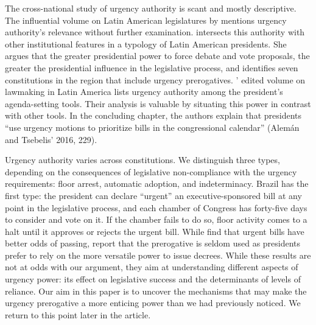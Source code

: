 \documentclass[letter,12pt]{article}
\begin{document}
The cross-national study of urgency authority is scant and mostly descriptive. The influential volume on Latin American legislatures by \citet{morgenstern.nacif.2002} mentions urgency authority’s relevance without further examination. \citet{garcia.montero.presidentes.2009} intersects this authority with other institutional features in a typology of Latin American presidents. She argues that the greater presidential power to force debate and vote proposals, the greater the presidential influence in the legislative process, and identifies seven constitutions in the region that include urgency prerogatives. \citeauthor{aleman-tsebelis-2016-book}' \citeyearpar{aleman-tsebelis-2016-book} edited volume on lawmaking in Latin America lists urgency authority among the president’s agenda-setting tools. Their analysis is valuable by situating this power in contrast with other tools. In the concluding chapter, the authors explain that presidents “use urgency motions to prioritize bills in the congressional calendar” (Alemán and Tsebelis’ 2016, 229). 

Urgency authority varies across constitutions. We distinguish three types, depending on the consequences of legislative non-compliance with the urgency requirements: floor arrest, automatic adoption, and indeterminacy. Brazil has the first type: the president can declare “urgent” an executive-sponsored bill at any point in the legislative process, and each chamber of Congress has forty-five days to consider and vote on it. If the chamber fails to do so, floor activity comes to a halt until it approves or rejects the urgent bill. While \citet{hiroi-renno-2016} find that urgent bills have better odds of passing, \citet{figueiredo.limongi.2000} report that the prerogative is seldom used as presidents prefer to rely on the more versatile power to issue decrees. While these results are not at odds with our argument, they aim at understanding different aspects of urgency power: its effect on legislative success and the determinants of levels of reliance. Our aim in this paper is to uncover the mechanisms that may make the urgency prerogative a more enticing power than we had previously noticed. We return to this point later in the article. %
\end{document}
